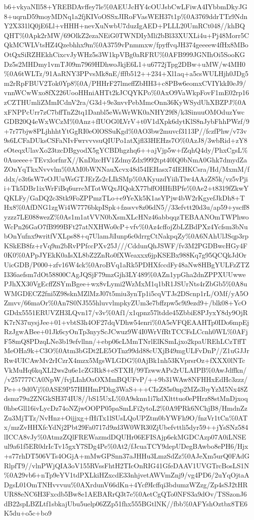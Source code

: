 \documentclass[]{article}
\begin{document}
b6+vkyaNIl58+YREBDAvffey7le\%0AEUJcHY4cOUJsbCwLFiwA4IYbbmDkyJG8+uqrnD59moyMDNq1a2fjKIVoOSSxJIRoFVasWEH37t1p\%0A3769ddrTTz9NdnY2X331lQ0jE6Ll+vHHH+nevXuNwbU7duzIgAED+PLLL20UmRCt048//khBQQHT\%0Apk2rMW/69OlkZ2ezaNEiG0TWNDIyMli2bBl33XUXLi4u+Pj48Morr5CQkMCWLVtsHZ4Qzebhhx9m\%0A3759vPnmmxw/fpyffvqJH374geeeew4fHx8MBoOtQxSiRZHEkhCixcvJyWHz5s3W1kpVBg0aRFRU\%0AFB999JGNIhOi5SooKGDz5s2MHDmy1vmTJ09m7969HDhwoJkjE6L1+u6772jTpg2DBw+uMW/w4MH0\%0A6tWLTz/91AaRNY3PPvsMk8nE/fffb512++234+Xl1aq+a5csWULHjh0JDg5m2rRpFBUV2Tok0Yp8\%0A/PHHrF27lmeffZbHH3+c8PBw6eomxCVIYkkI0eJ9/vnnWCwWxo8fX226UooHHniAHTt2kJCQYKPo\%0AxO9VaWkpFovF1mE02rp16zCZTHUmliZMmICdnV2ra/G3d+9e3nvvPebMmcOnn36KyWSydUhXBZPJ\%0AxFNPPcUrr7zC7bffTnZ2tq1Danbl5eWsWrWK0aNHY29f8/k3SinuuOMOduzYwcGDB20Q4eWxWCzM\%0Anz+fIUOG0LVrV+t0V1dXpk6dytKlS8nJybFhhPWzf/9+7r77bjw8PLjhhhtYtGgRI0eOlOSSuKgd\%0AO3bw2muvcf3113P//fczfPhw/v73v9s6LCFaDUksCSFaNIvFwrvvvsuQIUPo1atXjfl33HEHzs7O\%0AzJ8/3wbRid+zY8eOteqxUlavXo23tzcDBgyodX5gYCBDhgzhq6++ajVjp5w+fZqhQ4dy/PhxCgsL\%0Aueeee+TEvxlorfnrX//KnDlzcHV1ZdmyZdx9992tpt40lQ0bNmA0Ghk7dmydZaZOnYqTkxNvvvlm\%0AM0bWNNauXcvx48d54IEHasx74IEHKCsra/Hd/MxmM/fddx/e3t6sW7eOJUuWsGTJErZs2cLIkSMp\%0AKyuzdYiihTlw4AAzZ85k/vz5vPjii+Tk5DBr1ixWrFiBq6urrcMTotWQxJIQokX77bffOHHiBPfe\%0Ae2+t8319fZkwYQKLFy/GaDQ2c3Stk9FoZPPmzTLo+e9YeXk5K1asYPjw4bW2rKgyefJkDh8+THx8\%0AfDNG1zgWi4W7776bkpISpk+fzssvv8z06dN5//33efvtt20d3u/ap59+yscff8yzzz7LE088wezZ\%0As1m1atVVN0bXsmXLcHNz46abbqqzTEBAANOmTWPhwoWcPn26GaO7fB999BFt27atNXHWo0cP+vfv\%0Az4cffojZbLZBdPXz4Ycfsm3bNubOnYufnx9writfVXLps88+q7UlamJiIunp6c0drrgCtNakpqZy\%0A6NAhUlJSqp3rpKSkEB8fz+rVq9m2bRvPPfccPXv25J///CddunQhJSWF/fv3M2PGDBwcHGy4F0K0\%0APpJYEkK0aIsXL8bZ2ZnRo0fXWeaxxx6jpKSEBx988Kq7g95QCQkJdOrUicGDB/P000+zfv16W4ck\%0AroBVq1aRk5PDHXfccdFy48aNw8HBgYULFzZTZI336aefsm7dOt58800CAgJQSjF79mzGjh3LY489\%0AZn1ypGha2dnZPPXUUwwePJhXX30VgEcffZSYmBgee+wx8vLymi2WzMxM1q1bR1JSUrNts4rZbGb5\%0A8uWMGDECZ2fni5Z98sknMZlMzJ07t5miu3ynTp1i5cqVTJs2DScnp1rL/OMf/yA5OZmvv/66maOr\%0An7S0NJ555hluvvlmpkyZUm3e7bffzpw5c9i9ezd9+/blk08+YcOGDdx5551ERUVZH3LQvn17/v3v\%0Af1/x1qpnz57ltdde45ZbbiE8PJyxY8dy9OjRK7rN37uysjJee+01+vbtS3h4OF27dqVDhw54enri\%0A5eVFQEAAHTp0IDo6mpEjRzJgwABee+01Jk6cyOnTp3nyyScJCwuz9W4I0WrVfRtTCCFsLCcnh0WL\%0AFjF58mQ8PDzqLNe3b19efvllnn/+ebp06cLMmTNrlElKSmLjxo2kpaUREhLCzTffTMeOHa9k+C3O\%0Atm3bGDt2LE5OTnz99dd88cUXjB49mgULFvDnP//Z1uGJJrRw4UICAwMv2rICzrX4mzx5MgsWLGDG\%0AjBk1nh53KVprsrOz+fXXX0lNTcVkMuHq6kqXLl2ws2u6e1cZGRk8+eSTXH/99TzwwAPs2rULAIPB\%0AwJdffkn//v257777CA0NpW/fvjLIahOaOXMmBQUFvP/++9b31WAw8NFHHxEdHc3zzz/Pe++9d0Vj\%0ASE9P57HHHmPDhg3WaS+++CIzZ85s0np2MZs3byYzM5Nx48Zdsmz79u2ZNGkSH374IU8//bS15UxL\%0A9sknn1i7kdXltttuo0ePHrz88stMnDjxoq0hbeGll16ivLycDz74oNZjwOOPP05paSmLFi2ytoL2\%0A9PRk6NChjB8/HmdnZzZu3MjTTz/NvHnz+Oijjxg+fHiTx1lSUsLQoUPZtm0bYWFh9O/fnzVr1tCn\%0ATx/mzZvHHXfcYdNj2Pbt29Fa0717d9zd3W0WR30ZjUbefvttli5dyr59++jYsSNz584lICCA8vJy\%0AtmzZQlFREWazmdDQUHr06EFISAjp6ekMGDCAzp07A0iLNSEul9a61f5ER0drIcTv15gxY7SDg4Pe\%0At2/fJcuaTCY9depUDegBAwbo8ePH6/Hjx+s77rhDT506VTs4OGjA+mMwGPSnn37aJHHu3LmzSdZz\%0AJeXm5urQ0FAdGRlpfT9//vlnPWjQIA3oV155RVssFhtH2TIcOnRIG41GfeDAAV1UVGTrcBosLS1N\%0A29vb6+nTp9eYV1tdPXLkiHZxcdE33nhjvetAWVmZnj9/vg4PD6/2uYqOjtaADgsL01OmTNHvvvuu\%0AXrdunV66dKn+4Ycf9Icffqi3bdumzWZzg/Zp4sSJ2tHRUR88eNC6H3Fxcdb5Bw8e1AEBARrQ3t7e\%0AetCgQTo0NFS3a9dOv/TSSzonJ6dB22spLBZLtf1sbkajUbu5uelp06ZZp51fhx555BGtlNK//fbb\%0AFYshOztbx8TE6K5du+o5c+bo9
\end{document}
